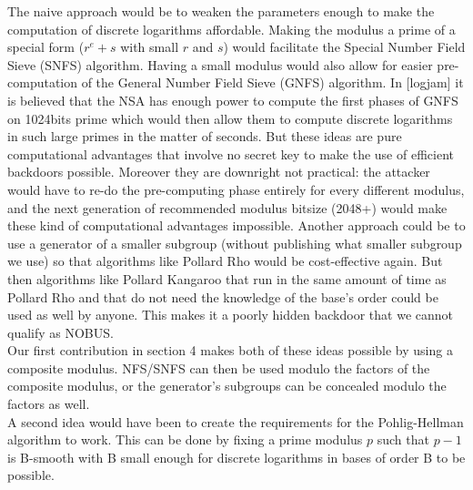 \documentclass[a4paper,11pt,twocolumn]{article}
\begin{document}
The naive approach would be to weaken the parameters enough to make the computation of discrete logarithms affordable. Making the modulus a prime of a special form ($r^e + s$ with small $r$ and $s$) would facilitate the Special Number Field Sieve (SNFS) algorithm. Having a small modulus would also allow for easier pre-computation of the General Number Field Sieve (GNFS) algorithm. In [logjam] it is believed that the NSA has enough power to compute the first phases of GNFS on 1024bits prime which would then allow them to compute discrete logarithms in such large primes in the matter of seconds. But these ideas are pure computational advantages that involve no secret key to make the use of efficient backdoors possible. Moreover they are downright not practical: the attacker would have to re-do the pre-computing phase entirely for every different modulus, and the next generation of recommended modulus bitsize (2048+) would make these kind of computational advantages impossible. Another approach could be to use a generator of a smaller subgroup (without publishing what smaller subgroup we use) so that algorithms like Pollard Rho would be cost-effective again. But then algorithms like Pollard Kangaroo that run in the same amount of time as Pollard Rho and that do not need the knowledge of the base's order could be used as well by anyone. This makes it a poorly hidden backdoor that we cannot qualify as NOBUS.\\

Our first contribution in section 4 makes both of these ideas possible by using a composite modulus. NFS/SNFS can then be used modulo the factors of the composite modulus, or the generator's subgroups can be concealed modulo the factors as well.\\

A second idea would have been to create the requirements for the Pohlig-Hellman algorithm to work. This can be done by fixing a prime modulus $p$ such that $p-1$ is B-smooth  with B small enough for discrete logarithms in bases of order B to be possible.\\

\begin{center}
\end{center}
\end{document}
